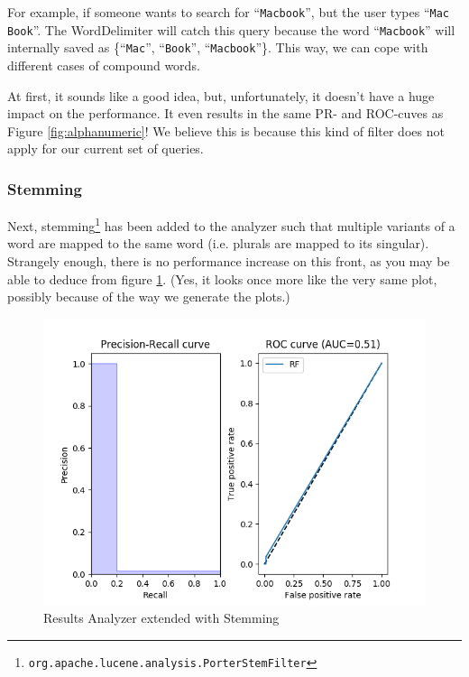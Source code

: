 \documentclass[11pt]{article}
\begin{document}
For example, if someone wants to search for ``\texttt{Macbook}'', but the user types ``\texttt{Mac Book}''. The WordDelimiter will catch this query because the word ``\texttt{Macbook}'' will internally saved as \{``\texttt{Mac}'', ``\texttt{Book}'', ``\texttt{Macbook}''\}. This way, we can cope with different cases of compound words.

At first, it sounds like a good idea, but, unfortunately, it doesn't have a huge impact on the performance. It even results in the same PR- and ROC-cuves as Figure \ref{fig:alphanumeric}! We believe this is because this kind of filter does not apply for our current set of queries.

\subsubsection{Stemming}\label{sec:stemming}
Next, stemming\footnote{\texttt{org.apache.lucene.analysis.PorterStemFilter}} has been added to the analyzer such that multiple variants of a word are mapped to the same word (i.e. plurals are mapped to its singular). Strangely enough, there is no performance increase on this front, as you may be able to deduce from figure \ref{fig:stemming}. (Yes, it looks once more like the very same plot, possibly because of the way we generate the plots.)

\begin{figure}[htp]
    \centering
    \includegraphics[width=\textwidth]{images/customAna-stem}
    \caption{Results Analyzer extended with Stemming}
    \label{fig:stemming}
\end{figure}
\end{document}
